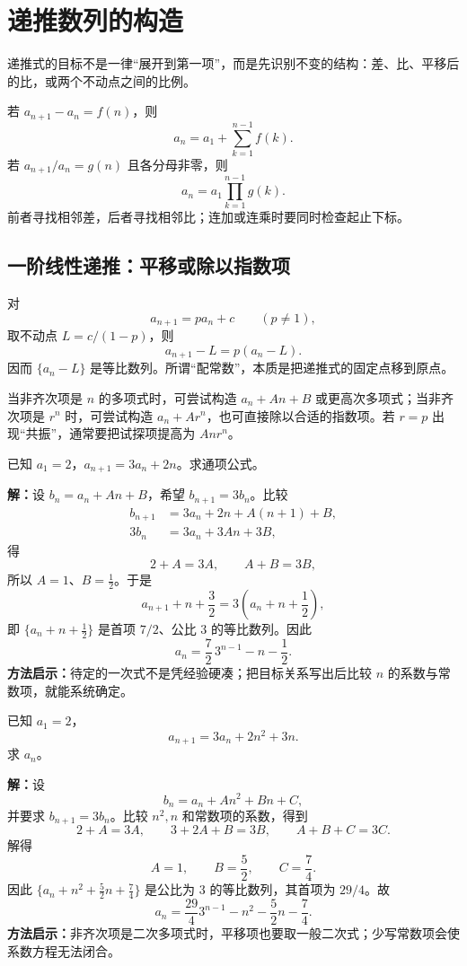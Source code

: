 \section{递推数列的构造}

递推式的目标不是一律“展开到第一项”，而是先识别不变的结构：差、比、平移后的比，或两个不动点之间的比例。

\begin{corollarybox}[累加与累乘]
  若 $a_{n+1}-a_n=f(n)$，则
  \[
    a_n=a_1+\sum_{k=1}^{n-1}f(k).
  \]
  若 $a_{n+1}/a_n=g(n)$ 且各分母非零，则
  \[
    a_n=a_1\prod_{k=1}^{n-1}g(k).
  \]
  前者寻找相邻差，后者寻找相邻比；连加或连乘时要同时检查起止下标。
\end{corollarybox}

\subsection{一阶线性递推：平移或除以指数项}

\begin{lawbox}[常数型一阶递推]
  对
  \[
    a_{n+1}=pa_n+c\qquad(p\ne1),
  \]
  取不动点 $L=c/(1-p)$，则
  \[
    a_{n+1}-L=p(a_n-L).
  \]
  因而 $\{a_n-L\}$ 是等比数列。所谓“配常数”，本质是把递推式的固定点移到原点。
\end{lawbox}

当非齐次项是 $n$ 的多项式时，可尝试构造 $a_n+An+B$ 或更高次多项式；当非齐次项是 $r^n$ 时，可尝试构造 $a_n+Ar^n$，也可直接除以合适的指数项。若 $r=p$ 出现“共振”，通常要把试探项提高为 $Anr^n$。

\begin{examplebox}
  已知 $a_1=2$，$a_{n+1}=3a_n+2n$。求通项公式。

  \textbf{解：}设 $b_n=a_n+An+B$，希望 $b_{n+1}=3b_n$。比较
  \begin{align*}
    b_{n+1}&=3a_n+2n+A(n+1)+B,\\
    3b_n&=3a_n+3An+3B,
  \end{align*}
  得
  \[
    2+A=3A,\qquad A+B=3B,
  \]
  所以 $A=1$、$B=\tfrac12$。于是
  \[
    a_{n+1}+n+\frac32=3\left(a_n+n+\frac12\right),
  \]
  即 $\{a_n+n+\tfrac12\}$ 是首项 $7/2$、公比 $3$ 的等比数列。因此
  \[
    \boxed{a_n=\frac72\,3^{n-1}-n-\frac12}.
  \]
  \textbf{方法启示：}待定的一次式不是凭经验硬凑；把目标关系写出后比较 $n$ 的系数与常数项，就能系统确定。
\end{examplebox}

\begin{examplebox}
  已知 $a_1=2$，
  \[
    a_{n+1}=3a_n+2n^2+3n.
  \]
  求 $a_n$。

  \textbf{解：}设
  \[
    b_n=a_n+An^2+Bn+C,
  \]
  并要求 $b_{n+1}=3b_n$。比较 $n^2,n$ 和常数项的系数，得到
  \[
    2+A=3A,\qquad 3+2A+B=3B,\qquad A+B+C=3C.
  \]
  解得
  \[
    A=1,\qquad B=\frac52,\qquad C=\frac74.
  \]
  因此 $\{a_n+n^2+\tfrac52n+\tfrac74\}$ 是公比为 $3$ 的等比数列，其首项为 $29/4$。故
  \[
    \boxed{a_n=\frac{29}{4}3^{n-1}-n^2-\frac52n-\frac74}.
  \]
  \textbf{方法启示：}非齐次项是二次多项式时，平移项也要取一般二次式；少写常数项会使系数方程无法闭合。
\end{examplebox}

